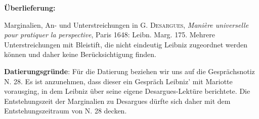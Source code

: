       
               
                \begin{ledgroupsized}[r]{120mm}
                \footnotesize 
                \pstart                
                \noindent\textbf{\"{U}berlieferung:}   
                \pend
                \end{ledgroupsized}
            
              
                            \begin{ledgroupsized}[r]{114mm}
                            \footnotesize 
                            \pstart \parindent -6mm
                            Marginalien, An- und Unterstreichungen in \textsc{G. Desargues}, \cite{00034}\textit{Mani\`{e}re universelle pour pratiquer la perspective}, Paris 1648: Leibn. Marg. 175. Mehrere Unterstreichungen mit Bleistift, die nicht eindeutig Leibniz zugeordnet werden k\"{o}nnen und daher keine Ber\"{u}cksichtigung finden. \pend
                            \end{ledgroupsized}
                \vspace*{5mm}
                \begin{ledgroup}
                \footnotesize 
                \pstart
            \noindent\footnotesize{\textbf{Datierungsgr\"{u}nde}: F\"{u}r die Datierung beziehen wir uns auf die Gespr\"{a}chsnotiz N. 28. Es ist anzunehmen, dass dieser ein Gespr\"{a}ch Leibniz' mit Mariotte\protect{} vorausging, in dem Leibniz \"{u}ber seine eigene Desargues-Lekt\"{u}re berichtete. Die Entstehungszeit der Marginalien zu Desargues d\"{u}rfte sich daher mit dem Entstehungszeitraum von N. 28 decken.}
                \pend
                \end{ledgroup}
            
